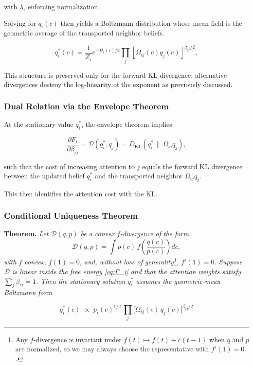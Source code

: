 \documentclass[twoside,11pt]{article}
\begin{document}
with $\lambda_i$ enforcing normalization.

Solving for $q_i(c)$ then yields a Boltzmann distribution whose mean field is the geometric average of the transported neighbor beliefs.

\begin{equation}
q_i^*(c)
= \frac{1}{Z_i}
e^{-H_i(c)/2}
\prod_j
[\Omega_{ij}(c) q_j(c)]^{\beta_{ij}/2},
\label{eq:q_i_star}
\end{equation}

This structure is preserved only for the forward KL divergence; alternative divergences destroy the log-linearity of the exponent as previously discussed.

\subsubsection{Dual Relation via the Envelope Theorem}
At the stationary value $q_i^*$, the envelope theorem implies

\begin{equation}
\frac{\partial F_i}{\partial \beta_{ij}}
= \mathcal{D}(q_i^*, q_j)
= D_{\mathrm{KL}}(q_i^* \,\|\, \Omega_{ij} q_j),
\label{eq:envelope}
\end{equation}

such that the cost of increasing attention to $j$ equals the forward KL divergence between the updated belief $q_i^*$ and the transported neighbor $\Omega_{ij} q_j$.

This then identifies the attention cost with the KL.

\subsubsection{Conditional Uniqueness Theorem}
\label{thm:uniqueness}

\textbf{Theorem.} \textit{Let\/ $\mathcal{D}(q,p)$ be a convex $f$-divergence of the form
\[
\mathcal{D}(q,p)
= \int p(c)\,f\!\!\left(\frac{q(c)}{p(c)}\right)dc,
\]
with $f$ convex, $f(1)=0$, and, without loss of generality\footnote{Any $f$-divergence is invariant under $f(t)\mapsto f(t)+c(t-1)$ when $q$ and $p$ are normalized, so we may always choose the representative with $f'(1)=0$.}, $f'(1)=0$.  Suppose $\mathcal{D}$ is linear inside the free energy \eqref{eq:F_i} and that the attention weights satisfy $\sum_j\beta_{ij}=1$.  Then the stationary solution $q_i^*$ assumes the geometric-mean Boltzmann form}

\begin{equation}
q_i^*(c) \;\propto\; p_i(c)^{1/2}\,\prod_{j}\bigl[\Omega_{ij}(c)\,q_j(c)\bigr]^{\beta_{ij}/2}
\label{eq:geometric_mean_target}
\end{equation}
\end{document}
